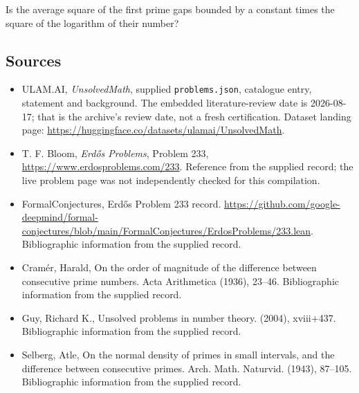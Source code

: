\documentclass[11pt,a4paper]{article}
\begin{document}
Is the average square of the first prime gaps bounded by a constant times the square of the logarithm of their number?

\subsection{Sources}

{\small

\begin{itemize}

\item[\hypertarget{source:statement:1}{S1}] ULAM.AI, \emph{UnsolvedMath}, supplied \texttt{problems.json}, catalogue entry, statement and background. The embedded literature-review date is 2026-08-17; that is the archive’s review date, not a fresh certification. Dataset landing page: \url{https://huggingface.co/datasets/ulamai/UnsolvedMath}.

\item[\hypertarget{source:statement:2}{S2}] T. F. Bloom, \emph{Erdős Problems}, Problem 233, \url{https://www.erdosproblems.com/233}. Reference from the supplied record; the live problem page was not independently checked for this compilation.

\item[\hypertarget{source:statement:3}{S3}] FormalConjectures, Erdős Problem 233 record. \url{https://github.com/google-deepmind/formal-conjectures/blob/main/FormalConjectures/ErdosProblems/233.lean}. Bibliographic information from the supplied record.

\item[\hypertarget{source:statement:4}{S4}] Cram\'{e}r, Harald, On the order of magnitude of the difference between consecutive prime numbers. Acta Arithmetica (1936), 23--46. Bibliographic information from the supplied record.

\item[\hypertarget{source:statement:5}{S5}] Guy, Richard K., Unsolved problems in number theory. (2004), xviii+437. Bibliographic information from the supplied record.

\item[\hypertarget{source:statement:6}{S6}] Selberg, Atle, On the normal density of primes in small intervals, and the difference between consecutive primes. Arch. Math. Naturvid. (1943), 87--105. Bibliographic information from the supplied record.

\end{itemize}

}

\label{end:statement}
\end{document}
